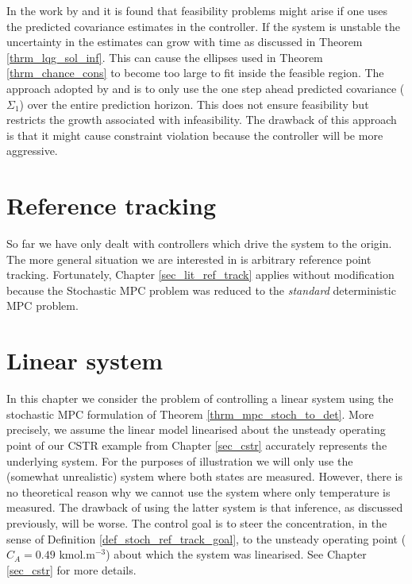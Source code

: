 In the work by \cite{yan1} and \cite{yan2} it is found that feasibility problems might arise if one uses the predicted covariance estimates in the controller. If the system is unstable the uncertainty in the estimates can grow with time as discussed in Theorem \ref{thrm_lqg_sol_inf}. This can cause the ellipses used in Theorem \ref{thrm_chance_cons} to become too large to fit inside the feasible region. The approach adopted by \cite{yan1} and \cite{yan2} is to only use the one step ahead predicted covariance ($\Sigma_1$) over the entire prediction horizon. This does not ensure feasibility but restricts the growth associated with infeasibility. The drawback of this approach is that it might cause constraint violation because the controller will be more aggressive.  

\section{Reference tracking}
So far we have only dealt with controllers which drive the system to the origin. The more general situation we are interested in is arbitrary reference point tracking. Fortunately, Chapter \ref{sec_lit_ref_track} applies without modification because the Stochastic MPC problem was reduced to the \textit{standard} deterministic MPC problem. 

\section{Linear system}
\label{sec_lin_sys_cont}
In this chapter we consider the problem of controlling a linear system using the stochastic MPC formulation of Theorem \ref{thrm_mpc_stoch_to_det}. More precisely, we assume the linear model linearised about the unsteady operating point of our CSTR example from Chapter \ref{sec_cstr} accurately represents the underlying system. For the purposes of illustration we will only use the (somewhat unrealistic) system where both states are measured. However, there is no theoretical reason why we cannot use the system where only temperature is measured. The drawback of using the latter system is that inference, as discussed previously, will be worse. The control goal is to steer the concentration, in the sense of Definition \ref{def_stoch_ref_track_goal}, to the unsteady operating point ($C_A = 0.49$ kmol.m$^{-3}$) about which the system was linearised. See Chapter \ref{sec_cstr} for more details.

